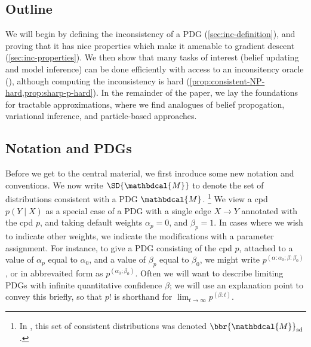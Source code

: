 \documentclass{article}
\theoremstyle{plain}
\theoremstyle{definition}
\theoremstyle{remark}
\newcommand{\dg}[1]{\mathbdcal{#1}}
\begin{document}



\subsection*{Outline}
We will begin by defining the inconsistency of a PDG (\cref{sec:inc-definition}), and proving that it has nice properties which make it amenable to gradient descent (\cref{sec:inc-properties}). We then show that many tasks of interest (belief updating and model inference) can be done efficiently with access to an inconsitency oracle (), although computing the inconsistency is hard (\cref{prop:consistent-NP-hard,prop:sharp-p-hard}).
In the remainder of the paper, we lay the foundations for tractable approximations, where we find analogues of belief propogation, variational inference, and particle-based approaches.


\subsection*{Notation and PDGs}
Before we get to the central material, we first inroduce some new notation and conventions. We now write $\SD{\dg M}$ to denote
the set of distributions consistent with a PDG $\dg M$.%
	\footnote{In \cite{richardson2020probabilistic}, this set of consistent distributions was denoted $\bbr{\dg M}_{\textrm{sd}}$.}
We view a cpd $p(Y \mid X)$ as a special case of a PDG with
a single edge $X \to Y$ annotated with the cpd $p$, and taking
default weights $\alpha_p = 0$, and $\beta_p = 1$. In cases where we wish
to indicate other weights, we indicate the modifications with a parameter
assignment. For instance, to give a PDG consisting of the cpd $p$, attached to
a value of $\alpha_p$ equal to $\alpha_0$, and
a value of $\beta_p$ equal to $\beta_0$, we might write
$ p^{(\alpha:\alpha_0;\beta : \beta_0)} $, or in abbrevaited form as $p^{(\alpha_0;\beta_0)}$.
Often we will want to describe limiting PDGs with infinite quantitative confidence $\beta$; we will use an explanation point to convey this briefly, so that $p!$ is shorthand for
$\displaystyle\lim_{t \to \infty} p^{(\beta:t)}$.
%
\end{document}
